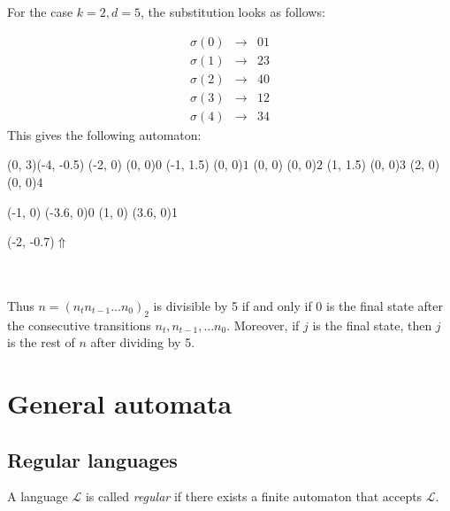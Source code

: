 \documentclass{article}
\begin{document}
For the case $k = 2, d = 5$, the substitution looks as follows:

\vbox{\begin{eqnarray*}
  \sigma(0) &\to& 01\\
  \sigma(1) &\to& 23\\
  \sigma(2) &\to& 40\\
  \sigma(3) &\to& 12\\
  \sigma(4) &\to& 34
\end{eqnarray*}}
This gives the following automaton:\\
\begin{graph}(0, 3)(-4, -0.5)
  (-2, 0) (0, 0){$0$}
  (-1, 1.5) (0, 0){$1$}
  (0, 0) (0, 0){$2$}
  (1, 1.5) (0, 0){$3$}
  (2, 0) (0, 0){$4$}

  (-1, 0) \freetext(-3.6, 0){0}
   
   
   
   
   
   
   
   
  (1, 0) \freetext(3.6, 0){1}

  \freetext(-2, -0.7){$\Uparrow$}
\end{graph}\\
\\
Thus $n = (n_t n_{t - 1} \ldots n_0)_2$ is divisible by 5 if and only if 0 is
the final state after the consecutive transitions $n_t, n_{t - 1}, \ldots n_0$.
Moreover, if $j$ is the final state, then $j$ is the rest of $n$ after dividing
by 5.

\section{General automata}
\subsection{Regular languages}
\begin{definition} \label{def:regular_language}
A language $\mathcal{L}$ is called \emph{regular} if there exists a finite 
automaton that accepts $\mathcal{L}$. 
\end{definition}
\end{document}
